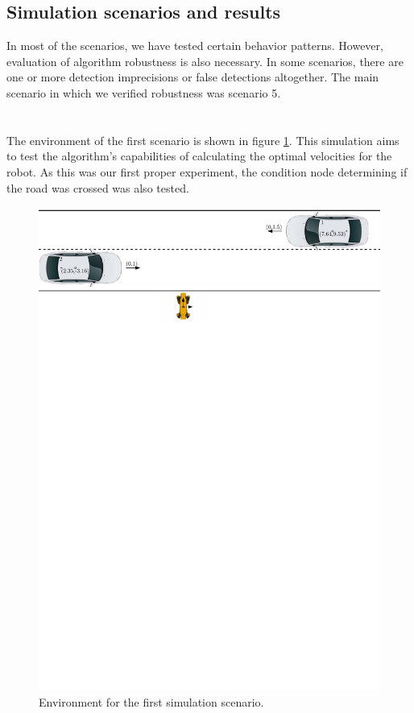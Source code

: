     \subsection{Simulation scenarios and results}
        In most of the scenarios, we have tested certain behavior patterns. However, evaluation of algorithm robustness is also necessary. In some scenarios, there are one or more detection imprecisions or false detections altogether. The main scenario in which we verified robustness was scenario 5.\\\\
        \\
            The environment of the first scenario is shown in figure \ref{fig:scene1}. This simulation aims to test the algorithm's capabilities of calculating the optimal velocities for the robot. As this was our first proper experiment, the condition node determining if the road was crossed was also tested.\\
            \begin{figure}[H]
                \centering
                \includegraphics[width=0.95\linewidth]{images/simulations/scene1.pdf}
                \caption{Environment for the first simulation scenario.}
                \label{fig:scene1}
            \end{figure}
